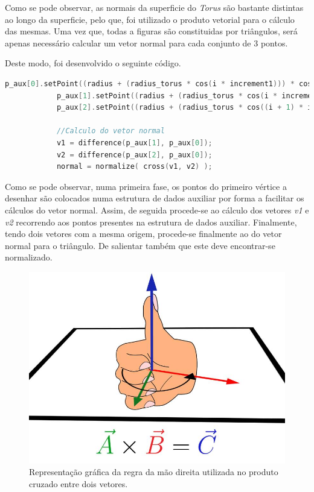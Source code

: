 \documentclass[a4paper]{article}
\begin{document}
Como se pode observar, as normais da superficie do \textit{Torus} são bastante distintas ao longo da superficie, pelo que, foi utilizado o produto vetorial para o cálculo das mesmas. Uma vez que, todas a figuras são constituidas por triângulos, será apenas necessário calcular um vetor normal para cada conjunto de 3 pontos.

Deste modo, foi desenvolvido o seguinte código.

\begin{lstlisting}[language=C++, caption=Código responsável pelo cálculo do vetor normal para um triângulo.]
            p_aux[0].setPoint((radius + (radius_torus * cos(i * increment1))) * cos(j * increment), (radius + (radius_torus * cos(i * increment1))) * sin(j * increment), radius_torus * sin(i * increment1));
            p_aux[1].setPoint((radius + (radius_torus * cos(i * increment1))) * cos((j + 1) * increment), (radius + (radius_torus * cos(i * increment1))) * sin((j + 1) * increment), radius_torus * sin(i * increment1));
            p_aux[2].setPoint((radius + (radius_torus * cos((i + 1) * increment1))) * cos(j * increment), (radius + (radius_torus * cos((i + 1) * increment1))) * sin(j * increment), radius_torus * sin((i + 1) * increment1));

            //Calculo do vetor normal
            v1 = difference(p_aux[1], p_aux[0]);
            v2 = difference(p_aux[2], p_aux[0]);
            normal = normalize( cross(v1, v2) );
\end{lstlisting}

Como se pode observar, numa primeira fase, os pontos do primeiro vértice a desenhar são colocados numa estrutura de dados auxiliar por forma a facilitar os cálculos do vetor normal. Assim, de seguida procede-se ao cálculo dos vetores \textit{v1} e \textit{v2} recorrendo aos pontos presentes na estrutura de dados auxiliar. Finalmente, tendo dois vetores com a mesma origem, procede-se finalmente ao do vetor normal para o triângulo. De salientar também que este deve encontrar-se normalizado.


\begin{figure}[!h]
    \centering
    \includegraphics[width=0.5\linewidth]{regra_mao_direita.jpg}
    \caption{Representação gráfica da regra da mão direita utilizada no produto cruzado entre dois vetores.}
    \label{fig:ref_mao_direita}
\end{figure}
\end{document}
